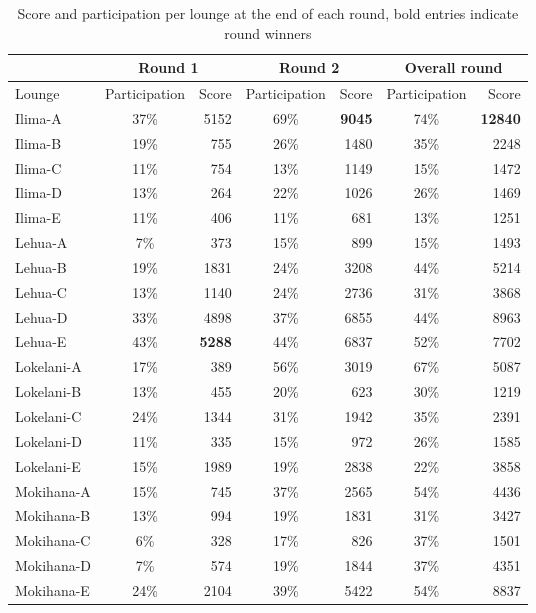 \begin{table}[htbp]
	\centering
		\begin{tabular}{ l | c | r | c | r | c | r |}
			\cline{2-7}
			 & \multicolumn{2}{c|}{Round 1} & \multicolumn{2}{c|}{Round 2} & \multicolumn{2}{c|}{Overall round} \\ \hline
			\multicolumn{1}{|l|}{Lounge} & Participation & Score & Participation & Score & Participation & Score \\ \hline \hline
			\multicolumn{1}{|l|}{Ilima-A} & 37\% & 5152 & 69\% & \textbf{9045} & 74\% & \textbf{12840} \\ \hline
			\multicolumn{1}{|l|}{Ilima-B} & 19\% & 755 & 26\% & 1480 & 35\% & 2248 \\ \hline
			\multicolumn{1}{|l|}{Ilima-C} & 11\% & 754 & 13\% & 1149 & 15\% & 1472 \\ \hline
			\multicolumn{1}{|l|}{Ilima-D} & 13\% & 264 & 22\% & 1026 & 26\% & 1469 \\ \hline
			\multicolumn{1}{|l|}{Ilima-E} & 11\% & 406 & 11\% & 681 & 13\% & 1251 \\ \hline
			\multicolumn{1}{|l|}{Lehua-A} & 7\% & 373 & 15\% & 899 & 15\% & 1493 \\ \hline
			\multicolumn{1}{|l|}{Lehua-B} & 19\% & 1831 & 24\% & 3208 & 44\% & 5214 \\ \hline
			\multicolumn{1}{|l|}{Lehua-C} & 13\% & 1140 & 24\% & 2736 & 31\% & 3868 \\ \hline
			\multicolumn{1}{|l|}{Lehua-D} & 33\% & 4898 & 37\% & 6855 & 44\% & 8963 \\ \hline
			\multicolumn{1}{|l|}{Lehua-E} & 43\% & \textbf{5288} & 44\% & 6837 & 52\% & 7702 \\ \hline
			\multicolumn{1}{|l|}{Lokelani-A} & 17\% & 389 & 56\% & 3019 & 67\% & 5087 \\ \hline
			\multicolumn{1}{|l|}{Lokelani-B} & 13\% & 455 & 20\% & 623 & 30\% & 1219 \\ \hline
			\multicolumn{1}{|l|}{Lokelani-C} & 24\% & 1344 & 31\% & 1942 & 35\% & 2391 \\ \hline
			\multicolumn{1}{|l|}{Lokelani-D} & 11\% & 335 & 15\% & 972 & 26\% & 1585 \\ \hline
			\multicolumn{1}{|l|}{Lokelani-E} & 15\% & 1989 & 19\% & 2838 & 22\% & 3858 \\ \hline
			\multicolumn{1}{|l|}{Mokihana-A} & 15\% & 745 & 37\% & 2565 & 54\% & 4436 \\ \hline
			\multicolumn{1}{|l|}{Mokihana-B} & 13\% & 994 & 19\% & 1831 & 31\% & 3427 \\ \hline
			\multicolumn{1}{|l|}{Mokihana-C} & 6\% & 328 & 17\% & 826 & 37\% & 1501 \\ \hline
			\multicolumn{1}{|l|}{Mokihana-D} & 7\% & 574 & 19\% & 1844 & 37\% & 4351 \\ \hline
			\multicolumn{1}{|l|}{Mokihana-E} & 24\% & 2104 & 39\% & 5422 & 54\% & 8837 \\ \hline
		\end{tabular}
	\caption[Score and participation per lounge at the end of each round]{Score and participation per lounge at the end of each round, bold entries indicate round winners}
\label{tab:lounge-participation}
\end{table}

